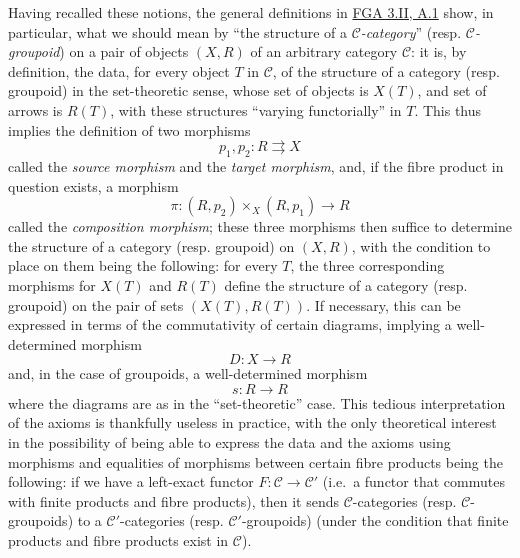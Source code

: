 \documentclass{article}
\newcommand{\oldpage}[1]{\marginpar{\footnotesize$\Big\vert$ \textit{p.~#1}}}
\theoremstyle{definition}
\theoremstyle{definition}
\theoremstyle{definition}
\theoremstyle{definition}
\theoremstyle{remark}
\begin{document}
Having recalled these notions, the general definitions in \protect\hyperlink{fga-3-ii-section-A.1}{FGA 3.II, A.1} show, in particular, what we should mean by ``the structure of a \emph{\({\mathcal{C}}\)-category}'' (resp. \emph{\({\mathcal{C}}\)-groupoid}) on a pair of objects \((X,R)\) of an arbitrary category \({\mathcal{C}}\):
it is, by definition, the data, for every object \(T\) in \({\mathcal{C}}\), of the structure of a category (resp. groupoid) in the set-theoretic sense, whose set of objects is \(X(T)\), and set of arrows is \(R(T)\), with these structures ``varying functorially'' in \(T\).
This thus implies the definition of two morphisms
\[
  p_1,p_2\colon R\rightrightarrows X
\]
\oldpage{212-09}called the \emph{source morphism} and the \emph{target morphism}, and, if the fibre product in question exists, a morphism
\[
  \pi\colon (R,p_2)\times_X(R,p_1) \to R
\]
called the \emph{composition morphism};
these three morphisms then suffice to determine the structure of a category (resp. groupoid) on \((X,R)\), with the condition to place on them being the following: for every \(T\), the three corresponding morphisms for \(X(T)\) and \(R(T)\) define the structure of a category (resp. groupoid) on the pair of sets \((X(T),R(T))\).
If necessary, this can be expressed in terms of the commutativity of certain diagrams, implying a well-determined morphism
\[
  D\colon X\to R
\]
and, in the case of groupoids, a well-determined morphism
\[
  s\colon R\to R
\]
where the diagrams are as in the ``set-theoretic'' case.
This tedious interpretation of the axioms is thankfully useless in practice, with the only theoretical interest in the possibility of being able to express the data and the axioms using morphisms and equalities of morphisms between certain fibre products being the following: if we have a left-exact functor \(F\colon{\mathcal{C}}\to{\mathcal{C}}'\) (i.e.~a functor that commutes with finite products and fibre products), then it sends \({\mathcal{C}}\)-categories (resp. \({\mathcal{C}}\)-groupoids) to a \({\mathcal{C}}'\)-categories (resp. \({\mathcal{C}}'\)-groupoids) (under the condition that finite products and fibre products exist in \({\mathcal{C}}\)).
\end{document}
